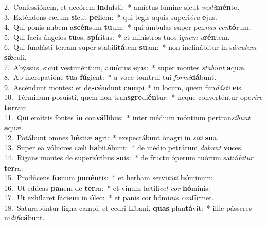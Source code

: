 {2.~}Confessiónem, et decórem \textbf{in}du\textbf{í}sti:~* amíctus lúmine sicut \textit{ve}\textit{sti}\textbf{mén}to.\\
{3.~}Exténdens cælum \textbf{si}cut \textbf{pel}lem:~* qui tegis aquis superi\textit{ó}\textit{ra} \textbf{e}jus.\\
{4.~}Qui ponis nubem a\textbf{scén}sum \textbf{tu}um:~* qui ámbulas super pen\textit{nas} \textit{ven}\textbf{tó}rum.\\
{5.~}Qui facis ángelos \textbf{tu}os, \textbf{spí}ritus:~* et minístros tuos i\textit{gnem} \textit{u}\textbf{rén}tem.\\
{6.~}Qui fundásti terram super stabili\textbf{tá}tem \textbf{su}am:~* non inclinábitur in sǽ\textit{cu}\textit{lum} \textbf{sǽ}culi.\\
{7.~}Abýssus, sicut vestiméntum, a\textbf{mí}ctus \textbf{e}jus:~* super montes \textit{sta}\textit{bunt} \textbf{a}quæ.\\
{8.~}Ab increpatióne \textbf{tu}a \textbf{fú}gient:~* a voce tonítrui tui \textit{for}\textit{mi}\textbf{dá}bunt.\\
{9.~}Ascéndunt montes: et de\textbf{scén}dunt \textbf{cam}pi~* in locum, quem fun\textit{dá}\textit{sti} \textbf{e}is.\\
{10.~}Términum posuísti, quem non tran\textbf{sgre}di\textbf{én}tur:~* neque converténtur ope\textit{rí}\textit{re} \textbf{ter}ram.\\
{11.~}Qui emíttis fontes \textbf{in} con\textbf{vál}libus:~* inter médium móntium pertran\textit{sí}\textit{bunt} \textbf{a}quæ.\\
{12.~}Potábunt omnes \textbf{bé}stiæ \textbf{a}gri:~* exspectábunt ónagri in \textit{si}\textit{ti} \textbf{su}a.\\
{13.~}Super ea vólucres cæli \textbf{ha}bi\textbf{tá}bunt:~* de médio petrárum \textit{da}\textit{bunt} \textbf{vo}ces.\\
{14.~}Rigans montes de superi\textbf{ó}ribus \textbf{su}is:~* de fructu óperum tuórum satiá\textit{bi}\textit{tur} \textbf{ter}ra:\\
{15.~}Prodúcens \textbf{fœ}num ju\textbf{mén}tis:~* et herbam servi\textit{tú}\textit{ti} \textbf{hó}minum:\\
{16.~}Ut edúcas \textbf{pa}nem de \textbf{ter}ra:~* et vinum lætífi\textit{cet} \textit{cor} \textbf{hó}minis:\\
{17.~}Ut exhílaret fáci\textbf{em} in \textbf{ó}leo:~* et panis cor hómi\textit{nis} \textit{con}\textbf{fír}met.\\
{18.~}Saturabúntur ligna campi, et cedri Líbani, \textbf{quas} plan\textbf{tá}vit:~* illic pásseres ni\textit{di}\textit{fi}\textbf{cá}bunt.\\

